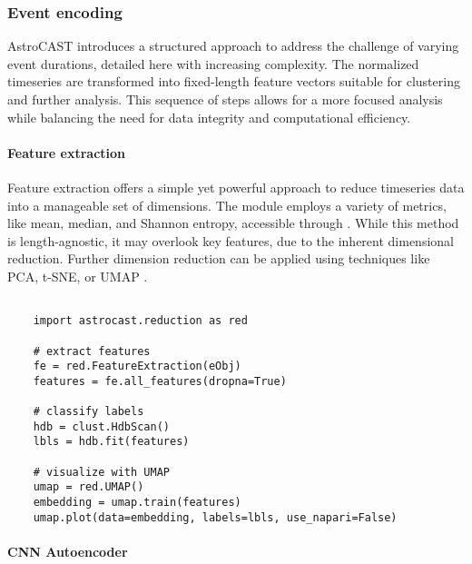 \subsubsection{Event encoding}

AstroCAST introduces a structured approach to address the challenge of varying event durations, detailed here with increasing complexity. The normalized timeseries are transformed into fixed-length feature vectors suitable for clustering and further analysis. This sequence of steps allows for a more focused analysis while balancing the need for data integrity and computational efficiency.


\paragraph{Feature extraction}
Feature extraction offers a simple yet powerful approach to reduce timeseries data into a manageable set of dimensions. The module employs a variety of metrics, like mean, median, and Shannon entropy, accessible through . While this method is length-agnostic, it may overlook key features, due to the inherent dimensional reduction. Further dimension reduction can be applied using techniques like PCA, t-SNE, or UMAP .

\begin{lstlisting}[style=pyStyle]

    import astrocast.reduction as red

    # extract features
    fe = red.FeatureExtraction(eObj)
    features = fe.all_features(dropna=True)

    # classify labels
    hdb = clust.HdbScan()
    lbls = hdb.fit(features)

    # visualize with UMAP
    umap = red.UMAP()
    embedding = umap.train(features)
    umap.plot(data=embedding, labels=lbls, use_napari=False)

\end{lstlisting}

\paragraph{\ac{CNN} Autoencoder}

